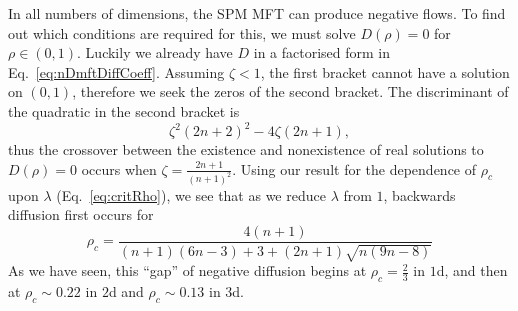 In all numbers of dimensions, the SPM MFT can produce negative flows. To find out which conditions
are required for this, we must solve $D(\rho) = 0$ for $\rho \in (0, 1)$. Luckily we already
have $D$ in a factorised form in Eq.~\ref{eq:nDmftDiffCoeff}. Assuming $\zeta<1$, the first bracket
cannot have a solution on $(0, 1)$, therefore we seek the zeros of the second bracket. The discriminant
of the quadratic in the second bracket is
\begin{equation}
 \zeta^2 (2n+2)^2 - 4\zeta (2n+1),
\end{equation}
thus the crossover between the existence and nonexistence of real solutions to $D(\rho)=0$ occurs
when $\zeta = \frac{2n+1}{(n+1)^2}$. Using our result for the dependence of $\rho_c$ upon $\lambda$
(Eq.~\ref{eq:critRho}), we see that as we reduce $\lambda$ from $1$, backwards diffusion first occurs for
\begin{equation}
 \rho_c = \frac{4(n+1)}{(n+1)(6 n - 3) + 3 + (2 n+1)\sqrt{n (9 n-8)}}
\end{equation}
As we have seen, this ``gap'' of negative diffusion begins at $\rho_c = \frac{2}{3}$ in $1$d, and 
then at $\rho_c\sim 0.22$ in $2$d and $\rho_c\sim 0.13$ in $3$d.



